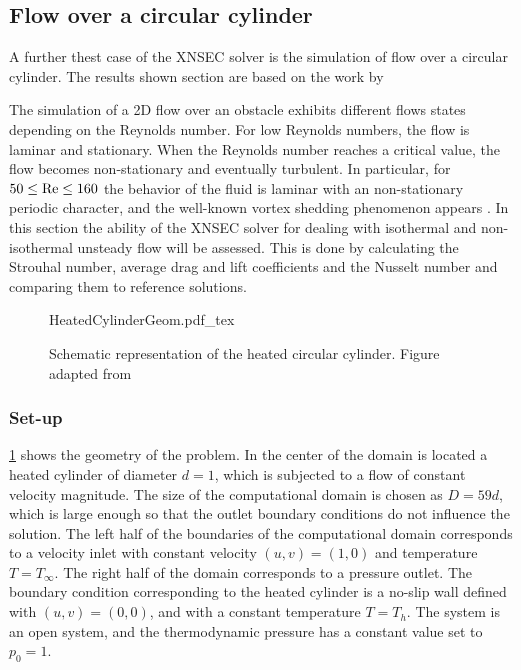 \subsection{Flow over a circular cylinder}\label{ssec:FlowCircCyl}

A further thest case of the XNSEC solver is the simulation of flow over a circular cylinder. The results shown section are based on the work by \textcite{miaoHighOrderSimulationLowMachFlows2022}

The simulation of a 2D flow over an obstacle exhibits different flows states depending on the Reynolds number. For low Reynolds numbers, the flow is laminar and stationary. When the Reynolds number reaches a critical value, the flow becomes non-stationary and eventually turbulent. In particular, for $50 \leq \text{Re} \leq 160$ the behavior of the fluid is laminar with an non-stationary periodic character, and the well-known vortex shedding phenomenon appears \parencite{sharmaHEATFLUIDFLOW2004}. In this section the ability of the XNSEC solver for dealing with isothermal and non-isothermal unsteady flow will be assessed. 
This is done by calculating the Strouhal number, average drag and lift coefficients and the Nusselt number and comparing them to reference solutions.
\begin{figure}[t!]
	\begin{center}
		\def\svgwidth{0.88\textwidth}
		{HeatedCylinderGeom.pdf_tex}
		\caption{Schematic representation of the heated circular cylinder. Figure adapted from \parencite{miaoHighOrderSimulationLowMachFlows2022}} 
		\label{fig:CircularCylinderGeom}%
	\end{center}%
\end{figure}%
\subsubsection{Set-up}
\cref{fig:CircularCylinderGeom} shows the geometry of the problem. In the center of the domain is located a heated cylinder of diameter $d = 1$, which is subjected to a flow of constant velocity magnitude. The size of the computational domain is chosen as $D = 59d$, which is large enough so that the outlet boundary conditions do not influence the solution. The left half of the boundaries of the computational domain corresponds to a velocity inlet with constant velocity $(u,v) = (1,0)$ and temperature $T = T_\infty$. The right half of the domain corresponds to a pressure outlet. The boundary condition corresponding to the heated cylinder is a no-slip wall defined with $(u,v) = (0,0)$, and with a constant temperature $T = T_h$. The system is an open system, and the thermodynamic pressure has a constant value set to $p_0 = 1$.

